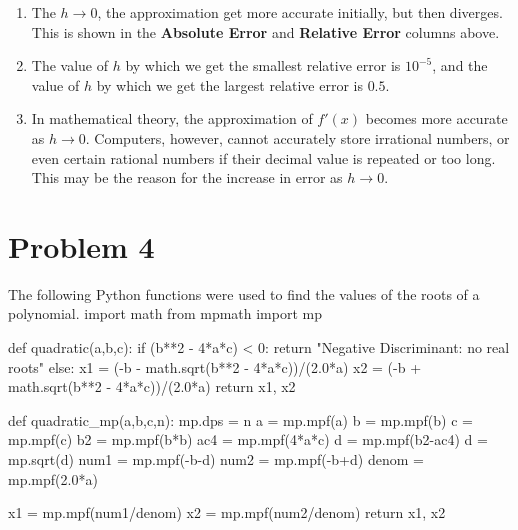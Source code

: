 \documentclass[12pt]{article}
\newenvironment{qv}
{\quote\Verbatim}
{\endVerbatim\endquote}
\begin{document}
\begin{enumerate}[\ \ (a)\ \ ]
\item The $h \rightarrow 0$, the approximation get more accurate initially, but then diverges.  This is shown in the {\bf Absolute Error} and {\bf Relative Error} columns above.
\item The value of $h$ by which we get the smallest relative error is $10^{-5}$, and the value of $h$ by which we get the largest relative error is $0.5$.
\item In mathematical theory, the approximation of $f'(x)$ becomes more accurate as $h \rightarrow 0$.  Computers, however, cannot accurately store irrational numbers, or even certain rational numbers if their decimal value is repeated or too long.  This may be the reason for the increase in error as $h \rightarrow 0$.
\end{enumerate}

\section*{Problem 4}

The following Python functions were used to find the values of the roots of a polynomial.
\begin{qv}
import math
from mpmath import mp

def quadratic(a,b,c):
    if (b**2 - 4*a*c) < 0:
        return "Negative Discriminant: no real roots"
    else:
        x1 = (-b - math.sqrt(b**2 - 4*a*c))/(2.0*a)
        x2 = (-b + math.sqrt(b**2 - 4*a*c))/(2.0*a)
        return x1, x2

def quadratic_mp(a,b,c,n):
    mp.dps = n
    a = mp.mpf(a)
    b = mp.mpf(b)
    c = mp.mpf(c)
    b2 = mp.mpf(b*b)
    ac4 = mp.mpf(4*a*c)
    d = mp.mpf(b2-ac4)
    d = mp.sqrt(d)
    num1 = mp.mpf(-b-d)
    num2 = mp.mpf(-b+d)
    denom = mp.mpf(2.0*a)

    x1 = mp.mpf(num1/denom)
    x2 = mp.mpf(num2/denom)
    return x1, x2
\end{qv}
\end{document}
